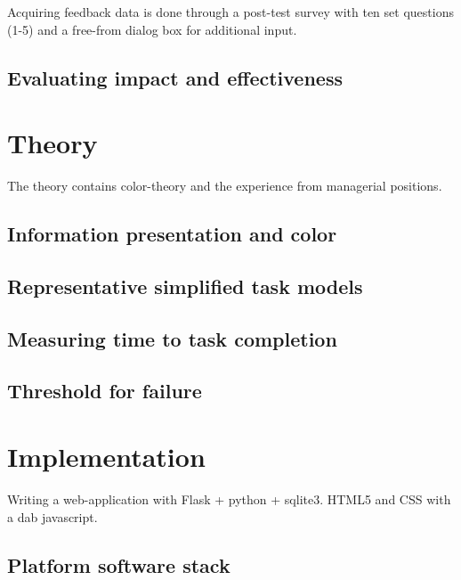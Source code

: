 \documentclass[nofilelist,dvipsnames]{cslthse-msc}
\begin{document}
        Acquiring feedback data is done through a post-test survey with ten set
        questions (1-5) and a free-from dialog box for additional input.


      \subsection{Evaluating impact and effectiveness}



		\section{Theory}

			The theory contains color-theory and the experience from managerial
			positions.

			\subsection{Information presentation and color}

			\subsection{Representative simplified task models}

			\subsection{Measuring time to task completion}

			\subsection{Threshold for failure}


		\section{Implementation}

			Writing a web-application with Flask + python + sqlite3.
			HTML5 and CSS with a dab javascript.

			\subsection{Platform software stack}
\end{document}
